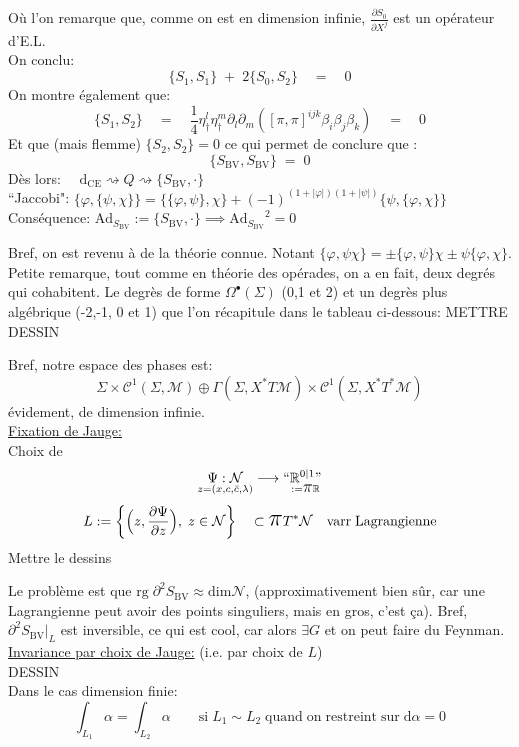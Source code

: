 \documentclass[a4paper,11pt]{article}
\renewcommand{\d}{{\mathrm{d}}}
\newcommand{\dr}[2]{\frac{\partial {#1}}{\partial{#2}}}
\newcommand{\ppi}{{\mathlarger{\mathlarger{\mathlarger{\pi}}}}}
\begin{document}
Où l'on remarque que, comme on est en dimension infinie, $\dr{S_0}{X^j}$ est un opérateur d'E.L.\\ On conclu:
$$\{S_1,S_1\}\;+\;2\{S_0,S_2\} \quad = \quad 0$$
On montre également que:
$$\{S_1,S_2\}\quad = \quad\frac14 \eta^l_\dag\eta^m_\dag\partial_l\partial_m \left([\pi,\pi]^{ijk}\beta_i\beta_j\beta_k\right) \quad = \quad 0$$
Et que (mais flemme) $\{S_2,S_2\} = 0$ ce qui permet de conclure que :
$$\boxed{\boxed{\{S_\mathrm{BV},S_\mathrm{BV}\} \; = \; 0}}$$
Dès lors: $\quad \d_\mathrm{CE} \rightsquigarrow Q \rightsquigarrow \{S_\mathrm{BV}, \cdot\}$\\
``Jaccobi": $\{\varphi,\{\psi, \chi\}\} = \{\{\varphi,\psi\},\chi\} + (-1)^{(1+|\varphi|)(1+|\psi|)}\{\psi,\{\varphi,\chi\}\}$\\
Conséquence: $\mathrm{Ad}_{S_\mathrm{BV}} := \{S_\mathrm{BV},\cdot\} \implies {\mathrm{Ad}_{S_\mathrm{BV}}}^2 = 0$

Bref, on est revenu à de la théorie connue. Notant $\{\varphi, \psi\chi\} = \pm \{\varphi,\psi\}\chi \pm \psi\{\varphi,\chi\}$. Petite remarque, tout comme en théorie des opérades, on a en fait, deux degrés qui cohabitent. Le degrès de forme $\Omega^\bullet(\Sigma)$ (0,1 et 2) et un degrès plus algébrique (-2,-1, 0 et 1) que l'on récapitule dans le tableau ci-dessous:
\color{red} METTRE DESSIN\color{black}

\noindent Bref, notre espace des phases est:
$$\Sigma\times\mathcal{C}^1(\Sigma,\mathcal{M}) \oplus \Gamma(\Sigma,X^*T\mathcal{M})\times \mathcal{C}^1(\Sigma,X^*T^*\mathcal{M})$$
évidement, de dimension infinie.\\

\noindent\underline{Fixation de Jauge:}\\
Choix de 
$$\underset{z=(x,c,\bar c, \lambda)}{\Psi : \mathcal{N}} \longrightarrow \underset{\;\;:=\ppi\mathbb{R}}{``\mathbb{R}^{0|1}"}$$
$$L := \left\{\Big(z,\dr\Psi z\Big), \; z\in\mathcal{N}\right\} \quad \subset \ppi  T^*\mathcal{N}\quad \mathrm{varr}\;\mathrm{Lagrangienne} $$
\color{red} Mettre le dessins\color{black}

Le problème est que $\mathrm{rg}\; \partial^2 S_\mathrm{BV} \approx \mathrm{dim}\mathcal{N}$, (approximativement bien sûr, car une Lagrangienne peut avoir des points singuliers, mais en gros, c'est ça). Bref, $\partial^2S_\mathrm{BV}|_L$ est inversible, ce qui est cool, car alors $\exists G$ et on peut faire du Feynman.\\

\noindent\underline{Invariance par choix de Jauge:} (i.e. par choix de $L$)\\
\color{red} DESSIN\color{black}\\
Dans le cas dimension finie:
$$\int_{L_1} \alpha = \int_{L_2} \alpha \quad \quad \mathrm{si}\; L_1 \sim L_2 \;\mathrm{quand}\;\mathrm{on}\;\mathrm{restreint}\;\mathrm{sur}\; \d\alpha=0$$
\end{document}

